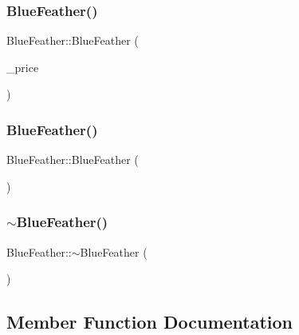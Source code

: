 \subsubsection{\texorpdfstring{BlueFeather()}{BlueFeather()}\hspace{0.1cm}{\footnotesize\ttfamily [1/2]}}
{\footnotesize\ttfamily Blue\+Feather\+::\+Blue\+Feather (\begin{DoxyParamCaption}\item[{int}]{\+\_\+price }\end{DoxyParamCaption})}

\mbox{\label{classBlueFeather_ab947fab3692927307631b9f211770a2b}} 
\subsubsection{\texorpdfstring{BlueFeather()}{BlueFeather()}\hspace{0.1cm}{\footnotesize\ttfamily [2/2]}}
{\footnotesize\ttfamily Blue\+Feather\+::\+Blue\+Feather (\begin{DoxyParamCaption}\item[{const \mbox{\hyperlink{classBlueFeather}{Blue\+Feather}} \&}]{ }\end{DoxyParamCaption})}

\mbox{\label{classBlueFeather_a07d02fd11d800c9540a97de37a093ab3}} 
\subsubsection{\texorpdfstring{$\sim$BlueFeather()}{~BlueFeather()}}
{\footnotesize\ttfamily Blue\+Feather\+::$\sim$\+Blue\+Feather (\begin{DoxyParamCaption}{ }\end{DoxyParamCaption})}



\subsection{Member Function Documentation}
\mbox{\label{classBlueFeather_af30eff7845128300baf3117f5ba8bbf0}} 
